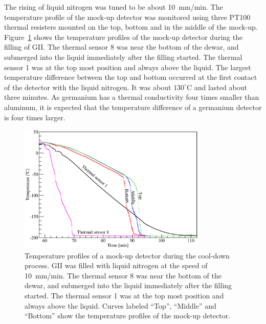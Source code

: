 The rising of liquid nitrogen was tuned to be about 10~mm/min. The temperature profile of the mock-up detector was monitored using three PT100 thermal resisters mounted on the top, bottom and in the middle of the mock-up. Figure~\ref{fig:ii:temp} shows the temperature profiles of the mock-up detector during the filling of GII. The thermal sensor 8 was near the bottom of the dewar, and submerged into the liquid immediately after the filling started. The thermal sensor 1 was at the top most position and always above the liquid. The largest temperature difference between the top and bottom  occurred at the first contact of the detector with the liquid nitrogen. It was about $130^{\circ}$C and lasted about three minutes. As germanium has a thermal conductivity four times smaller than aluminum, it is expected that the temperature difference of a germanium detector is four times larger.

\begin{figure}[htbp]
\centering
\includegraphics[width=0.8\textwidth]{temp}
\caption{Temperature profiles of a mock-up detector during the cool-down process. GII was filled with liquid nitrogen at the speed of 10~mm/min. The thermal sensor 8 was near the bottom of the dewar, and submerged into the liquid immediately after the filling started. The thermal sensor 1 was at the top most position and always above the liquid. Curves labeled ``Top'', ``Middle'' and ``Bottom'' show the temperature profiles of the mock-up detector.}
\label{fig:ii:temp}
\end{figure}

